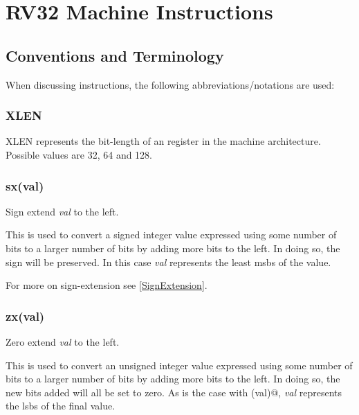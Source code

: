
\newcommand\instructionHeader[1]{{\large\tt \string#1}}

\chapter{RV32 Machine Instructions}
\label{chapter:RV32}

\section{Conventions and Terminology}

When discussing instructions, the following abbreviations/notations are used:

\subsection{XLEN}

XLEN represents the bit-length of an  register in the machine architecture.
Possible values are 32, 64 and 128.

\subsection{sx(val)}
\label{extension:sx}

Sign extend {\em val} to the left.

This is used to convert a signed integer value expressed using some number of 
bits to a larger number of bits by adding more bits to the left.  In doing so, 
the sign will be preserved.  In this case {\em val} represents the least 
\acrshort{msb}s of the value.  

For more on sign-extension see \autoref{SignExtension}.

\subsection{zx(val)}
\label{extension:zx}

Zero extend {\em val} to the left.

This is used to convert an unsigned integer value expressed using some number of 
bits to a larger number of bits by adding more bits to the left.  In doing so, 
the new bits added will all be set to zero.  As is the case with \verb@sx(val)@,
{\em val} represents the \acrshort{lsb}s of the final value.  

